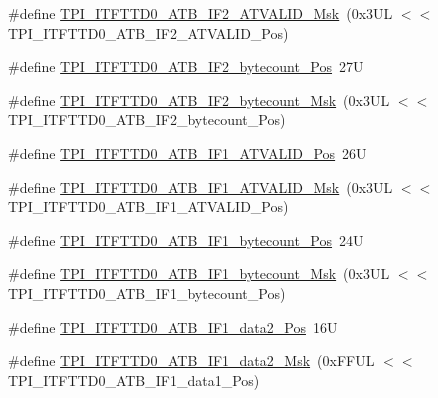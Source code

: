 \begin{DoxyCompactItemize}
\item 
\#define \mbox{\hyperlink{group___c_m_s_i_s___t_p_i_gac6fc2d04903210afe2599482a72e0a25}{T\+P\+I\+\_\+\+I\+T\+F\+T\+T\+D0\+\_\+\+A\+T\+B\+\_\+\+I\+F2\+\_\+\+A\+T\+V\+A\+L\+I\+D\+\_\+\+Msk}}~(0x3\+U\+L $<$$<$ T\+P\+I\+\_\+\+I\+T\+F\+T\+T\+D0\+\_\+\+A\+T\+B\+\_\+\+I\+F2\+\_\+\+A\+T\+V\+A\+L\+I\+D\+\_\+\+Pos)
\item 
\#define \mbox{\hyperlink{group___c_m_s_i_s___t_p_i_gadaa8bfec760711c2d190d5fd124706fe}{T\+P\+I\+\_\+\+I\+T\+F\+T\+T\+D0\+\_\+\+A\+T\+B\+\_\+\+I\+F2\+\_\+bytecount\+\_\+\+Pos}}~27U
\item 
\#define \mbox{\hyperlink{group___c_m_s_i_s___t_p_i_ga8b342379b5d45d46459807859a8a6687}{T\+P\+I\+\_\+\+I\+T\+F\+T\+T\+D0\+\_\+\+A\+T\+B\+\_\+\+I\+F2\+\_\+bytecount\+\_\+\+Msk}}~(0x3\+U\+L $<$$<$ T\+P\+I\+\_\+\+I\+T\+F\+T\+T\+D0\+\_\+\+A\+T\+B\+\_\+\+I\+F2\+\_\+bytecount\+\_\+\+Pos)
\item 
\#define \mbox{\hyperlink{group___c_m_s_i_s___t_p_i_ga0b95f6b474fe2e4b7ba9963b00d18258}{T\+P\+I\+\_\+\+I\+T\+F\+T\+T\+D0\+\_\+\+A\+T\+B\+\_\+\+I\+F1\+\_\+\+A\+T\+V\+A\+L\+I\+D\+\_\+\+Pos}}~26U
\item 
\#define \mbox{\hyperlink{group___c_m_s_i_s___t_p_i_ga8650e68e2efc65b0d94de91772dc5940}{T\+P\+I\+\_\+\+I\+T\+F\+T\+T\+D0\+\_\+\+A\+T\+B\+\_\+\+I\+F1\+\_\+\+A\+T\+V\+A\+L\+I\+D\+\_\+\+Msk}}~(0x3\+U\+L $<$$<$ T\+P\+I\+\_\+\+I\+T\+F\+T\+T\+D0\+\_\+\+A\+T\+B\+\_\+\+I\+F1\+\_\+\+A\+T\+V\+A\+L\+I\+D\+\_\+\+Pos)
\item 
\#define \mbox{\hyperlink{group___c_m_s_i_s___t_p_i_gae82d334486fb5d11e57e8e07fd21be7b}{T\+P\+I\+\_\+\+I\+T\+F\+T\+T\+D0\+\_\+\+A\+T\+B\+\_\+\+I\+F1\+\_\+bytecount\+\_\+\+Pos}}~24U
\item 
\#define \mbox{\hyperlink{group___c_m_s_i_s___t_p_i_ga71301ef5984fef602d83305f34ea5c97}{T\+P\+I\+\_\+\+I\+T\+F\+T\+T\+D0\+\_\+\+A\+T\+B\+\_\+\+I\+F1\+\_\+bytecount\+\_\+\+Msk}}~(0x3\+U\+L $<$$<$ T\+P\+I\+\_\+\+I\+T\+F\+T\+T\+D0\+\_\+\+A\+T\+B\+\_\+\+I\+F1\+\_\+bytecount\+\_\+\+Pos)
\item 
\#define \mbox{\hyperlink{group___c_m_s_i_s___t_p_i_ga79e526cc6f0857f45187e897f4009f55}{T\+P\+I\+\_\+\+I\+T\+F\+T\+T\+D0\+\_\+\+A\+T\+B\+\_\+\+I\+F1\+\_\+data2\+\_\+\+Pos}}~16U
\item 
\#define \mbox{\hyperlink{group___c_m_s_i_s___t_p_i_ga942cc46e6e858b215e81ef6b57c3f63f}{T\+P\+I\+\_\+\+I\+T\+F\+T\+T\+D0\+\_\+\+A\+T\+B\+\_\+\+I\+F1\+\_\+data2\+\_\+\+Msk}}~(0x\+F\+F\+U\+L $<$$<$ T\+P\+I\+\_\+\+I\+T\+F\+T\+T\+D0\+\_\+\+A\+T\+B\+\_\+\+I\+F1\+\_\+data1\+\_\+\+Pos)
$$
\end{DoxyCompactItemize}
